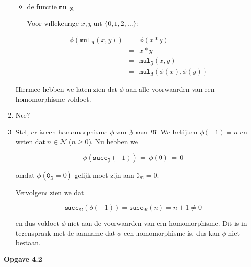 \documentclass[a4paper,11pt]{article}
\begin{document}
\begin{enumerate}
\begin{itemize}
\item{de functie $\texttt{mul}_{\mathfrak{N}}$}

  Voor willekeurige $x,y$ uit $\{0,1,2,\ldots\}$:

  \begin{eqnarray*}
    \phi(\texttt{mul}_{\mathfrak{N}}(x,y)) & = & \phi(x*y) \\
                                         & = & x*y \\
                                         & = & \texttt{mul}_{\mathfrak{Z}}(x,y) \\
                                         & = & \texttt{mul}_{\mathfrak{Z}}(\phi(x),\phi(y))
  \end{eqnarray*}

\end{itemize}

Hiermee hebben we laten zien dat $\phi$ aan alle voorwaarden van een
homomorphisme voldoet.

\item %

Nee?

\item %

Stel, er is een homomorphisme $\phi$ van $\mathfrak{Z}$ naar
$\mathfrak{N}$. We bekijken $\phi(-1)=n$ en weten dat $n \in \mathcal{N}$ ($n
\ge 0$). Nu hebben we

\begin{displaymath}
\phi(\texttt{succ}_{\mathfrak{Z}}(-1)) \, = \, \phi(0) \, = \, 0
\end{displaymath}

omdat $\phi(\texttt{0}_{\mathfrak{Z}}=0)$ gelijk moet zijn aan
$\texttt{0}_{\mathfrak{N}} = 0$.

Vervolgens zien we dat

\begin{displaymath}
\texttt{succ}_{\mathfrak{N}}(\phi(-1)) = \texttt{succ}_{\mathfrak{N}}(n) = n+1 \ne 0
\end{displaymath}

en dus voldoet $\phi$ niet aan de voorwaarden van een homomorphisme. Dit is in
tegenspraak met de aanname dat $\phi$ een homomorphisme is, dus kan $\phi$ niet
bestaan.\\[2em]

\end{enumerate}


{\bf Opgave 4.2}
\end{document}
